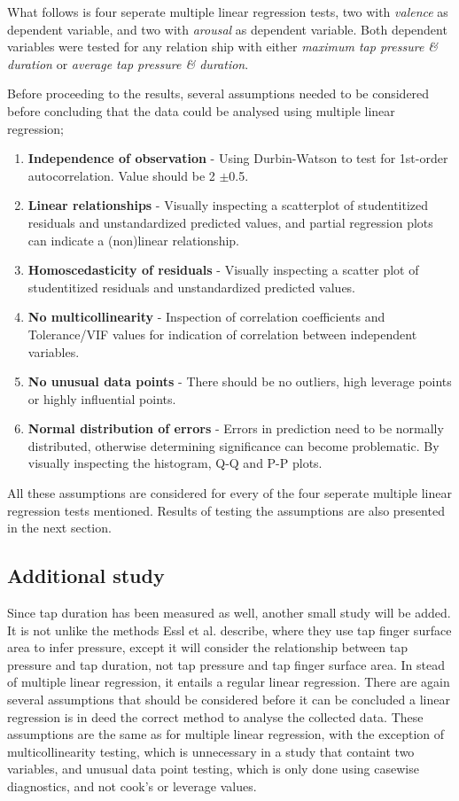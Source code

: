 \documentclass{sigchi}
\begin{document}
What follows is four seperate multiple linear regression tests, two with \textit{valence} as dependent variable, and two with \textit{arousal} as dependent variable. Both dependent variables were tested for any relation ship with either \textit{maximum tap pressure \& duration} or \textit{average tap pressure \& duration}.

Before proceeding to the results, several assumptions needed to be considered before concluding that the data could be analysed using multiple linear regression;
\begin{enumerate}
  \item \textbf{Independence of observation} - Using Durbin-Watson to test for 1st-order autocorrelation. Value should be 2 $\pm$0.5.
  \item \textbf{Linear relationships} - Visually inspecting a scatterplot of studentitized residuals and unstandardized predicted values, and partial regression plots can indicate a (non)linear relationship.
  \item \textbf{Homoscedasticity of residuals} - Visually inspecting a scatter plot of studentitized residuals and unstandardized predicted values.
  \item \textbf{No multicollinearity} - Inspection of correlation coefficients and Tolerance/VIF values for indication of correlation between independent variables.
  \item \textbf{No unusual data points} - There should be no outliers, high leverage points or highly influential points.
  \item \textbf{Normal distribution of errors} - Errors in prediction need to be normally distributed, otherwise determining significance can become problematic. By visually inspecting the histogram, Q-Q and P-P plots.
\end{enumerate}
All these assumptions are considered for every of the four seperate multiple linear regression tests mentioned. Results of testing the assumptions are also presented in the next section.


\subsection{Additional study} %
\label{sub:additional_study}
Since tap duration has been measured as well, another small study will be added. It is not unlike the methods Essl et al. \cite{Essl2010} describe, where they use tap finger surface area to infer pressure, except it will consider the relationship between tap pressure and tap duration, not tap pressure and tap finger surface area. In stead of multiple linear regression, it entails a regular linear regression. There are again several assumptions that should be considered before it can be concluded a linear regression is in deed the correct method to analyse the collected data. These assumptions are the same as for multiple linear regression, with the exception of multicollinearity testing, which is unnecessary in a study that containt two variables, and unusual data point testing, which is only done using casewise diagnostics, and not cook's or leverage values.
\end{document}
